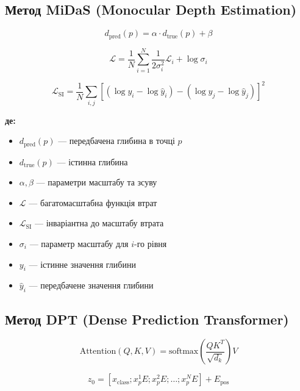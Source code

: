 \documentclass[14pt, a4paper]{extarticle}
\numberwithin{equation}{section}
\begin{document}
\subsection{Метод MiDaS (Monocular Depth Estimation)}

\begin{equation}
d_{\text{pred}}(p) = \alpha \cdot d_{\text{true}}(p) + \beta \tag{33}
\end{equation}

\begin{equation}
\boxed{\mathcal{L} = \frac{1}{N} \sum_{i=1}^N \frac{1}{2\sigma_i^2} \mathcal{L}_i + \log \sigma_i} \tag{34}
\end{equation}

\begin{equation}
\boxed{\mathcal{L}_{\text{SI}} = \frac{1}{N} \sum_{i,j} \left[ (\log y_i - \log \hat{y}_i) - (\log y_j - \log \hat{y}_j) \right]^2} \tag{35}
\end{equation}

\textbf{де:}
\begin{itemize}
\item $d_{\text{pred}}(p)$ — передбачена глибина в точці $p$
\item $d_{\text{true}}(p)$ — істинна глибина
\item $\alpha, \beta$ — параметри масштабу та зсуву
\item $\mathcal{L}$ — багатомасштабна функція втрат
\item $\mathcal{L}_{\text{SI}}$ — інваріантна до масштабу втрата
\item $\sigma_i$ — параметр масштабу для $i$-го рівня
\item $y_i$ — істинне значення глибини
\item $\hat{y}_i$ — передбачене значення глибини
\end{itemize}

\subsection{Метод DPT (Dense Prediction Transformer)}

\begin{equation}
\boxed{\text{Attention}(Q, K, V) = \text{softmax}\left(\frac{QK^T}{\sqrt{d_k}}\right)V} \tag{36}
\end{equation}

\begin{equation}
z_0 = [x_{\text{class}}; x_p^1 E; x_p^2 E; \ldots; x_p^N E] + E_{\text{pos}} \tag{37}
\end{equation}
\end{document}
